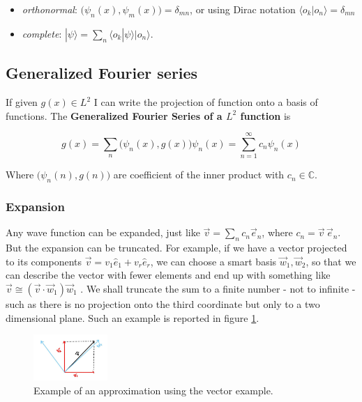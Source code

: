 	\begin{multicols}{2}
		\begin{itemize}
		\item \textit{orthonormal}: $\bigl(\psi_n(x),\psi_m(x)\bigr)=\delta_{mn}$, or using Dirac notation $\langle o_k|o_n \rangle = \delta_{mn}$
		\item \textit{complete}: $ | \psi \rangle = \sum_n \langle o_k | \psi \rangle |o_n \rangle$.
		\end{itemize}
	\end{multicols}

	\subsection{Generalized Fourier series}
	If given $g(x)\in L^2$ I can write the projection of function onto a basis of functions.
	The \textbf{Generalized Fourier Series of a $L^2$ function} is

	$$g(x)=\sum_{n}\bigl(\psi_n(x),g(x)\bigr)\psi_n(x) =\sum_{n=1}^{\infty}c_n\psi_n(x)$$

	Where $\bigl(\psi_n(n),g(n)\bigr)$ are coefficient of the inner product with $c_n\in \mathbb{C}$.

		\subsubsection{Expansion}
	
		Any wave function can be expanded, just like $\vec{v} = \sum_n c_n \vec{e}_n$, where $c_n = \vec{v} \, \vec{e}_n$.
		But the expansion can be truncated.
		For example, if we have a vector projected to its components $\vec v = v_1\hat{e}_1+v_r\hat{e}_r$, we can choose a smart basis ${\vec{w}_1, \vec{w}_2}$, so that we can describe the vector with fewer elements and end up with something like $ \vec{v} \cong (\vec{v} \cdot \vec{w}_1) \vec{w}_1 $ .
		We shall truncate the sum to a finite number - not to infinite - such as there is no projection onto the third coordinate but only to a two dimensional plane. Such an example is reported in figure \ref{fig:vector}.
	\begin{figure}[htbp!]
    \centering
    \includegraphics[width=0.25\textwidth]{vector.jpg}
    \caption{Example of an approximation using the vector example.}
    \label{fig:vector}
\end{figure}

